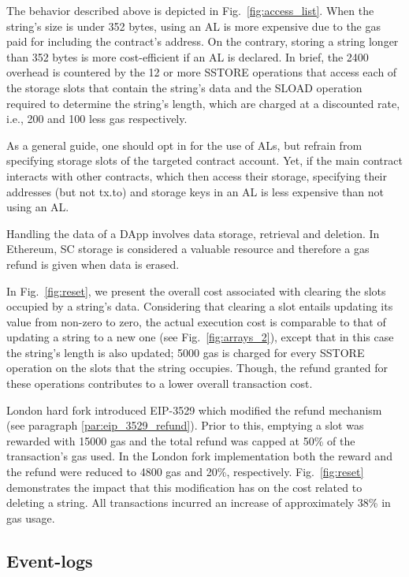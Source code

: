The behavior described above is depicted in Fig.~\ref{fig:access_list}. When the string’s size is under 352 bytes, using an AL is more expensive due to the gas paid for including the contract’s address. On the contrary, storing a string longer than 352 bytes is more cost-efficient if an AL is declared. In brief, the 2400 overhead is countered by the 12 or more SSTORE operations that access each of the storage slots that contain the string's data and the SLOAD operation required to determine the string's length, which are charged at a discounted rate, i.e., 200 and 100 less gas respectively.

As a general guide, one should opt in for the use of ALs, but refrain from specifying storage slots of the targeted contract account. Yet, if the main contract interacts with other contracts, which then access their storage, specifying their addresses (but not tx.to) and storage keys in an AL is less expensive than not using an AL.

Handling the data of a DApp involves data storage, retrieval and deletion. In Ethereum, SC storage is considered a valuable resource and therefore a gas refund is given when data is erased.

In Fig.~\ref{fig:reset}, we present the overall cost associated with clearing the slots occupied by a string’s data. Considering that clearing a slot entails updating its value from non-zero to zero, the actual execution cost is comparable to that of updating a string to a new one (see Fig.~\ref{fig:arrays_2}), except that in this case the string's length is also updated; 5000 gas is charged for every SSTORE operation on the slots that the string occupies. Though, the refund granted for these operations contributes to a lower overall transaction cost.

London hard fork introduced EIP-3529  \citep{buterin_eip_3529} which modified the refund mechanism (see paragraph \ref{par:eip_3529_refund}). Prior to this, emptying a slot was rewarded with 15000 gas and the total refund was capped at 50\% of the transaction’s gas used. In the London fork implementation both the reward and the refund were reduced to 4800 gas and 20\%, respectively. Fig.~\ref{fig:reset} demonstrates the impact that this modification has on the cost related to deleting a string. All transactions incurred an increase of approximately 38\% in gas usage.

\subsection{Event-logs}\label{subsection:evaluation_logs}

